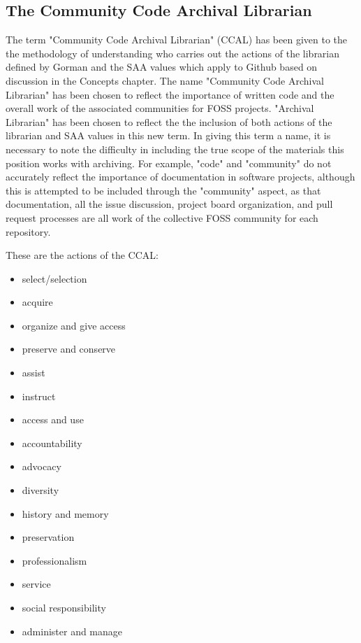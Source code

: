 \subsection{The Community Code Archival Librarian}

The term "Community Code Archival Librarian" (CCAL) has been given to the the methodology of understanding who carries out the actions of the librarian defined by Gorman \cite{gorman2000values} and the SAA values \cite{rubin2016foundationslis} which apply to Github based on discussion in the Concepts chapter. The name "Community Code Archival Librarian" has been chosen to reflect the importance of written code and the overall work of the associated communities for FOSS projects. "Archival Librarian" has been chosen to reflect the the inclusion of both actions of the librarian and SAA values in this new term. In giving this term a name, it is necessary to note the difficulty in including the true scope of the materials this position works with archiving. For example, "code" and "community" do not accurately reflect the importance of documentation in software projects, although this is attempted to be included through the "community" aspect, as that documentation, all the issue discussion, project board organization, and pull request processes are all work of the collective FOSS community for each repository.

These are the actions of the CCAL: 
\begin{itemize}
    \item select\cite{gorman2000values}/selection\cite{rubin2016foundationslis}
    \item acquire \cite{gorman2000values}
    \item organize and give access \cite{gorman2000values}
    \item preserve and conserve \cite{gorman2000values}
    \item assist \cite{gorman2000values}
    \item instruct \cite{gorman2000values}
    \item access and use \cite{rubin2016foundationslis}
    \item accountability \cite{rubin2016foundationslis}
    \item advocacy \cite{rubin2016foundationslis}
    \item diversity \cite{rubin2016foundationslis}
    \item history and memory \cite{rubin2016foundationslis}
    \item preservation \cite{rubin2016foundationslis}
    \item professionalism \cite{rubin2016foundationslis}
    \item service \cite{rubin2016foundationslis}
    \item social responsibility \cite{rubin2016foundationslis}
    \item administer and manage 
\end{itemize}

